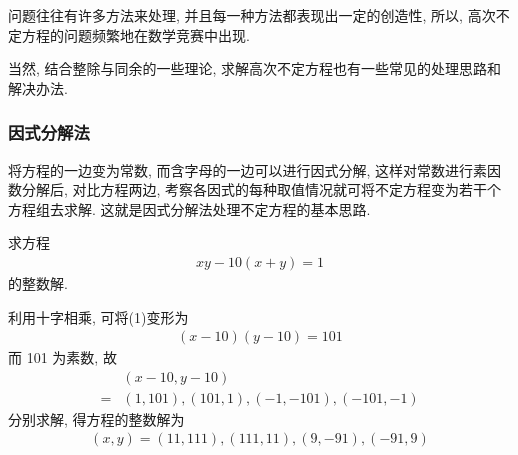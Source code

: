 问题往往有许多方法来处理, 并且每一种方法都表现出一定的创造性, 所以, 高次不定方程的问题频繁地在数学竞赛中出现.

当然, 结合整除与同余的一些理论, 求解高次不定方程也有一些常见的处理思路和解决办法.

\subsubsection{因式分解法}
将方程的一边变为常数, 而含字母的一边可以进行因式分解, 这样对常数进行素因数分解后, 对比方程两边, 考察各因式的每种取值情况就可将不定方程变为若干个方程组去求解. 这就是因式分解法处理不定方程的基本思路.

\begin{example}
	求方程
	\begin{align*}
		x y-10(x+y)=1
	\end{align*}
	的整数解.
\end{example}
\begin{solution}
	利用十字相乘, 可将(1)变形为
	\begin{align*}
		(x-10)(y-10)=101
	\end{align*}
	而 101 为素数, 故\begin{align}
		  & (x-10, y-10)                        \\
		= & (1,101),(101,1),(-1,-101),(-101,-1)
	\end{align}
	分别求解, 得方程的整数解为
	\begin{align*}
		(x, y)=(11,111),(111,11),(9,-91),(-91,9)
	\end{align*}
\end{solution}

